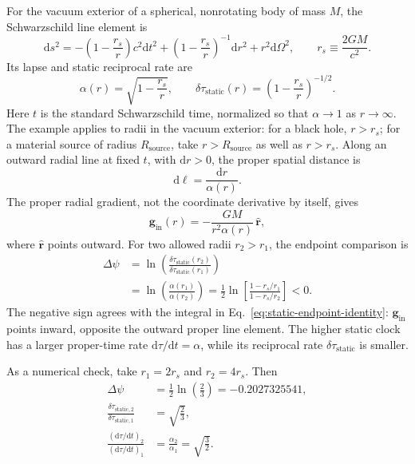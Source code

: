 \documentclass[12pt]{article}
\begin{document}
For the vacuum exterior of a spherical, nonrotating body of mass $M$, the Schwarzschild line element is \cite{Schwarzschild,Wald}
\begin{equation}
  \mathrm{d}s^2
  =-\left(1-\frac{r_s}{r}\right)c^2\mathrm{d}t^2
   +\left(1-\frac{r_s}{r}\right)^{-1}\mathrm{d}r^2
   +r^2\mathrm{d}\Omega^2,
  \qquad
  r_s\equiv\frac{2GM}{c^2}.
  \label{eq:schwarzschild-metric}
\end{equation}
Its lapse and static reciprocal rate are
\begin{equation}
  \alpha(r)=\sqrt{1-\frac{r_s}{r}},
  \qquad
  \delta\tau_{\mathrm{static}}(r)
  =\left(1-\frac{r_s}{r}\right)^{-1/2}.
  \label{eq:schwarzschild-rate}
\end{equation}
Here $t$ is the standard Schwarzschild time, normalized so that $\alpha\to1$ as $r\to\infty$. The example applies to radii in the vacuum exterior: for a black hole, $r>r_s$; for a material source of radius $R_{\mathrm{source}}$, take $r>R_{\mathrm{source}}$ as well as $r>r_s$. Along an outward radial line at fixed $t$, with $\mathrm{d}r>0$, the proper spatial distance is
\begin{equation}
  \mathrm{d}\ell=\frac{\mathrm{d}r}{\alpha(r)}.
  \label{eq:schwarzschild-proper-distance}
\end{equation}
The proper radial gradient, not the coordinate derivative by itself, gives
\begin{equation}
  \mathbf{g}_{\mathrm{in}}(r)
  =-\frac{GM}{r^2\alpha(r)}\,\hat{\mathbf r},
  \label{eq:schwarzschild-inward-field}
\end{equation}
where $\hat{\mathbf r}$ points outward. For two allowed radii $r_2>r_1$, the endpoint comparison is
\begin{align}
  \Delta\psi
  &=\ln\!\left(
    \frac{\delta\tau_{\mathrm{static}}(r_2)}
         {\delta\tau_{\mathrm{static}}(r_1)}\right) \\
  &=\ln\!\left(\frac{\alpha(r_1)}{\alpha(r_2)}\right)
   =\frac{1}{2}\ln\!\left[
     \frac{1-r_s/r_1}{1-r_s/r_2}\right]
   <0.
  \label{eq:schwarzschild-clock-ratio}
\end{align}
The negative sign agrees with the integral in Eq.~\eqref{eq:static-endpoint-identity}: $\mathbf{g}_{\mathrm{in}}$ points inward, opposite the outward proper line element. The higher static clock has a larger proper-time rate $\mathrm{d}\tau/\mathrm{d}t=\alpha$, while its reciprocal rate $\delta\tau_{\mathrm{static}}$ is smaller.

As a numerical check, take $r_1=2r_s$ and $r_2=4r_s$. Then
\begin{equation}
  \begin{aligned}
    \Delta\psi&=\frac{1}{2}\ln\!\left(\frac{2}{3}\right)=-0.2027325541,\\
    \frac{\delta\tau_{\mathrm{static},2}}{\delta\tau_{\mathrm{static},1}}&=\sqrt{\frac{2}{3}},\\
    \frac{(\mathrm{d}\tau/\mathrm{d}t)_2}{(\mathrm{d}\tau/\mathrm{d}t)_1}&=\frac{\alpha_2}{\alpha_1}=\sqrt{\frac{3}{2}}.
  \end{aligned}
\end{equation}
\end{document}
